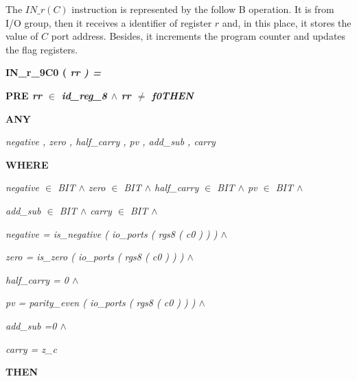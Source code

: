 \documentclass[11pt]{article} %
\newcommand{\footnoterecall}[1]{
  \footnotemark[\value{#1}]
}
\begin{document}
The $\mathit{IN\_r(C)}$\footnoterecall{myfootnote} instruction is represented
by the follow B operation. It is from I/O group, then it receives a identifier of register
$\mathit{r}$ and, in this place, it stores the value of $\mathit{C}$ port address. Besides, it increments the
program counter and updates the flag registers.

\hspace*{0.0in}\bf IN\_r\_9C0 \rm ( \it rr \rm ) \rm =

\hspace*{0.0in}\bf PRE \it rr  $\in$  \it id\_reg\_8  $\land$  \it rr  $\not =$  \it f0\hspace*{0.15in}\bf THEN

\hspace*{0.20in}\bf ANY

\hspace*{0.40in}\it negative \rm , \it zero \rm , \it half\_carry \rm , \it pv \rm , \it add\_sub \rm , \it carry

\hspace*{0.20in}\bf WHERE 

\hspace*{0.40in}\it negative $\in$ \it BIT $\land$ \it zero $\in$ \it BIT $\land$ \it half\_carry $\in$ \it BIT 
$\land$ \it pv $\in$ \it BIT $\land$

 \hspace*{0.40in}\it add\_sub $\in$ \it BIT $\land$ \it carry $\in$ \it BIT  $\land$

\hspace*{0.40in}\it negative \rm = \it is\_negative \rm ( \it io\_ports \rm ( \it rgs8 \rm ( \it c0 \rm ) \rm ) \rm )  $\land$ 

\hspace*{0.40in}\it zero \rm = \it is\_zero \rm ( \it io\_ports \rm ( \it rgs8 \rm ( \it c0 \rm ) \rm ) \rm )  $\land$ 

\hspace*{0.40in}\it half\_carry \rm = \rm 0  $\land$ 

\hspace*{0.40in}\it pv \rm = \it parity\_even \rm ( \it io\_ports \rm ( \it rgs8 \rm ( \it c0 \rm ) \rm ) \rm ) $\land$

\hspace*{0.40in}\it add\_sub \rm =\hspace*{0.10in}\rm 0  $\land$ 

\hspace*{0.40in}\it carry \rm = \it z\_c

\hspace*{0.20in}\bf THEN
\end{document}
